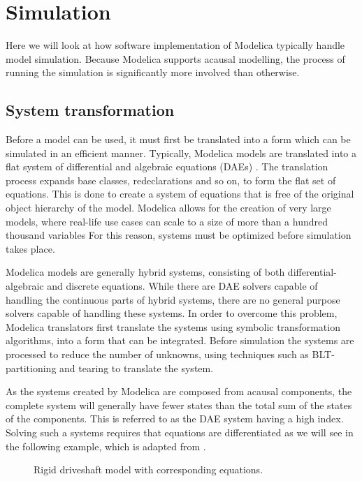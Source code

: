 \documentclass[\rootfolder/main.tex]{subfiles}
\begin{document}
\section{Simulation}

Here we will look at how software implementation of Modelica typically handle model simulation.
Because Modelica supports acausal modelling, the process of running the simulation is significantly more involved than otherwise.

\subsection{System transformation}

Before a model can be used, it must first be translated into a form which can be simulated in an efficient manner.
Typically, Modelica models are translated into a flat system of differential and algebraic equations (DAEs) \cite{openmodelica.org:lundvall:sims:2005}.
The translation process expands base classes, redeclarations and so on, to form the flat set of equations.
This is done to create a system of equations that is free of the original object hierarchy of the model.
Modelica allows for the creation of very large models, where real-life use cases can scale to a size of more than a hundred thousand variables
For this reason, systems must be optimized before simulation takes place.

Modelica models are generally hybrid systems, consisting of both differential-algebraic and discrete equations.
While there are DAE solvers capable of handling the continuous parts of hybrid systems, there are no general purpose solvers capable of handling these systems.
In order to overcome this problem, Modelica translators first translate the systems using symbolic transformation algorithms, into a form that can be integrated.
Before simulation the systems are processed to reduce the number of unknowns, using techniques such as BLT-partitioning and tearing \cite{clauss2002} to translate the system.

As the systems created by Modelica are composed from acausal components, the complete system will generally have fewer states than the total sum of the states of the components.
This is referred to as the DAE system having a high index.
Solving such a systems requires that equations are differentiated as we will see in the following example, which is adapted from \cite{clauss2002}.

\begin{figure}[ht]
	\begin{minipage}[c]{.75\columnwidth}
	\end{minipage}%
	\begin{minipage}[c]{.25\columnwidth}
	\end{minipage}
    \caption{Rigid driveshaft model with corresponding equations.}
\end{figure}
\end{document}
